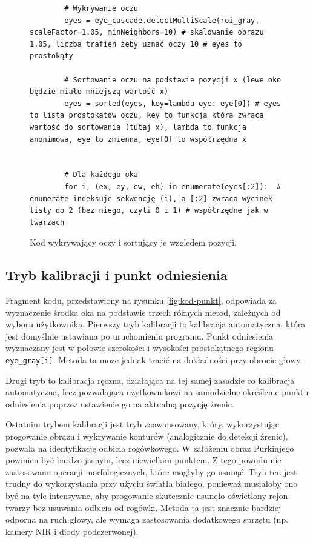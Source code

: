 \documentclass[a4paper,twoside,12pt]{book}
\begin{document}
\begin{figure}[htbp]
	\centering
	\begin{lstlisting}
		# Wykrywanie oczu
		eyes = eye_cascade.detectMultiScale(roi_gray, scaleFactor=1.05, minNeighbors=10) # skalowanie obrazu 1.05, liczba trafień żeby uznać oczy 10 # eyes to prostokąty
		
		# Sortowanie oczu na podstawie pozycji x (lewe oko będzie miało mniejszą wartość x)
		eyes = sorted(eyes, key=lambda eye: eye[0]) # eyes to lista prostokątów oczu, key to funkcja która zwraca wartość do sortowania (tutaj x), lambda to funkcja anonimowa, eye to zmienna, eye[0] to współrzędna x

		
		# Dla każdego oka
		for i, (ex, ey, ew, eh) in enumerate(eyes[:2]):  # enumerate indeksuje sekwencję (i), a [:2] zwraca wycinek listy do 2 (bez niego, czyli 0 i 1) # współrzędne jak w twarzach
	\end{lstlisting}
\caption{Kod wykrywający oczy i sortujący je wzgledem pozycji.}
\label{fig:kod-wykrywanie-oczu}
\end{figure}

\subsection{Tryb kalibracji i punkt odniesienia}
\label{subsec:Tryb-kalibracji-i-punkt-odniesienia}

Fragment kodu, przedstawiony na rysunku \ref{fig:kod-punkt}, odpowiada za wyznaczenie środka oka na podstawie trzech różnych metod, zależnych od wyboru użytkownika. Pierwszy tryb kalibracji to kalibracja automatyczna, która jest domyślnie ustawiana po uruchomieniu programu. Punkt odniesienia wyznaczany jest w połowie szerokości i wysokości prostokątnego regionu \texttt{eye\-\_gray[i]}. Metoda ta może jednak tracić na dokładności przy obrocie głowy.

Drugi tryb to kalibracja ręczna, działająca na tej samej zasadzie co kalibracja automatyczna, lecz pozwalająca użytkownikowi na samodzielne określenie punktu odniesienia poprzez ustawienie go na aktualną pozycję źrenic.

Ostatnim trybem kalibracji jest tryb zaawansowany, który, wykorzystując progowanie obrazu i wykrywanie konturów (analogicznie do detekcji źrenic), pozwala na identyfikację odbicia rogówkowego. W założeniu obraz Purkinjego powinien być bardzo jasnym, lecz niewielkim punktem. Z tego powodu nie zastosowano operacji morfologicznych, które mogłyby go usunąć. Tryb ten jest trudny do wykorzystania przy użyciu światła białego, ponieważ musiałoby ono być na tyle intensywne, aby progowanie skutecznie usunęło oświetlony rejon twarzy bez usuwania odbicia od rogówki. Metoda ta jest znacznie bardziej odporna na ruch głowy, ale wymaga zastosowania dodatkowego sprzętu (np. kamery NIR i diody podczerwonej).
\end{document}
